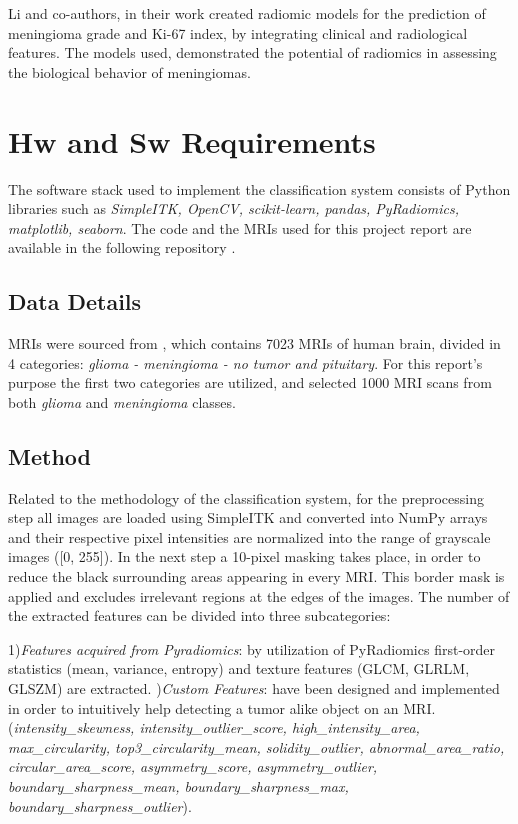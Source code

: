 \documentclass[11pt,a4paper]{article}
\begin{document}
	Li and co-authors\cite{li}, in their work created radiomic models for the
	prediction of meningioma grade and Ki-67 index, 
	by integrating clinical and radiological features. 
	The models used, demonstrated the potential of radiomics in assessing 
	the biological behavior of meningiomas.

    \section{Hw and Sw Requirements}
	\par The software stack used to implement the classification system consists of Python libraries
	such as \textit{SimpleITK, OpenCV, scikit-learn, pandas, PyRadiomics, matplotlib, seaborn}.
	The code and the MRIs used for this project report are available in the following repository \cite{code}.
    \subsection{Data Details}
	MRIs were sourced from \cite{data}, which contains 7023 MRIs of human brain, divided 
	in 4 categories: \textit{glioma - meningioma - no tumor and pituitary}.
	For this report's purpose the first two categories are utilized, and selected 1000 MRI scans from both \textit{glioma} and
	\textit{meningioma} classes.

    \subsection{Method}
	
	\par Related to the methodology of the classification system, for the preprocessing step
	all images are loaded using SimpleITK
	and converted into NumPy arrays and their respective pixel intensities are 
	normalized into the range of grayscale images ([0, 255]).
	In the next step a 10-pixel masking takes place, in order to reduce the black surrounding areas
	appearing in every MRI. This border mask is applied and excludes irrelevant regions at the 
	edges of the images. The number of the extracted features can be divided into three subcategories:

	1)\textit{Features acquired from Pyradiomics}: by utilization of PyRadiomics first-order statistics (mean, variance, entropy) and
	texture features (GLCM, GLRLM, GLSZM) are extracted.
	)\textit{Custom Features}: have been designed and implemented in order to intuitively help detecting a tumor alike
	object on an MRI. (\textit{intensity\_skewness, intensity\_outlier\_score, high\_intensity\_area, max\_circularity,
	top3\_circularity\_mean, solidity\_outlier, abnormal\_area\_ratio, circular\_area\_score, asymmetry\_score, asymmetry\_outlier,
	boundary\_sharpness\_mean, boundary\_sharpness\_max, boundary\_sharpness\_outlier}).
\end{document}
